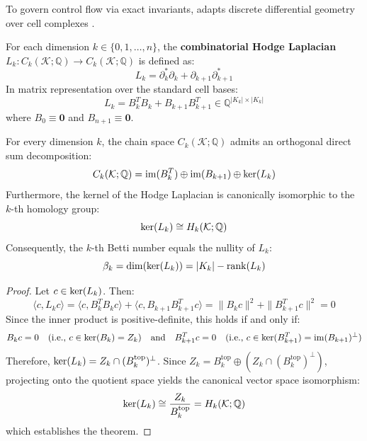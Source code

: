 To govern control flow via exact invariants, \ToposLang{} adapts discrete differential geometry over cell complexes \cite{lim2020hodge}.

\begin{definition}
For each dimension $k \in \{0, 1, \dots, n\}$, the \textbf{combinatorial Hodge Laplacian} $L_k : C_k(\mathcal{K}; \mathbb{Q}) \to C_k(\mathcal{K}; \mathbb{Q})$ is defined as:
\begin{equation}
    L_k = \partial_k^* \partial_k + \partial_{k+1} \partial_{k+1}^*
\end{equation}
In matrix representation over the standard cell bases:
\begin{equation}
    L_k = B_k^T B_k + B_{k+1} B_{k+1}^T \in \mathbb{Q}^{|K_k| \times |K_k|}
\end{equation}
where $B_0 \equiv \mathbf{0}$ and $B_{n+1} \equiv \mathbf{0}$.
\end{definition}

\begin{theorem}
\label{thm:hodge_decomp}
For every dimension $k$, the chain space $C_k(\mathcal{K}; \mathbb{Q})$ admits an orthogonal direct sum decomposition:
\begin{equation}
    C_k(\mathcal{K}; \mathbb{Q}) = \operatorname{im}(B_k^T) \oplus \operatorname{im}(B_{k+1}) \oplus \operatorname{ker}(L_k)
\end{equation}
Furthermore, the kernel of the Hodge Laplacian is canonically isomorphic to the $k$-th homology group:
\begin{equation}
    \operatorname{ker}(L_k) \cong H_k(\mathcal{K}; \mathbb{Q})
\end{equation}
Consequently, the $k$-th Betti number equals the nullity of $L_k$:
\begin{equation}
    \beta_k = \dim(\operatorname{ker}(L_k)) = |K_k| - \operatorname{rank}(L_k)
\end{equation}
\end{theorem}

\begin{proof}
Let $c \in \operatorname{ker}(L_k)$. Then:
\begin{equation}
    \langle c, L_k c \rangle = \langle c, B_k^T B_k c \rangle + \langle c, B_{k+1} B_{k+1}^T c \rangle = \| B_k c \|^2 + \| B_{k+1}^T c \|^2 = 0
\end{equation}
Since the inner product is positive-definite, this holds if and only if:
\begin{equation}
    B_k c = 0 \quad (\text{i.e., } c \in \operatorname{ker}(B_k) = Z_k) \quad \text{and} \quad B_{k+1}^T c = 0 \quad (\text{i.e., } c \in \operatorname{ker}(B_{k+1}^T) = \operatorname{im}(B_{k+1})^\perp)
\end{equation}
Therefore, $\operatorname{ker}(L_k) = Z_k \cap (B_k^{\text{top}})^\perp$. Since $Z_k = B_k^{\text{top}} \oplus (Z_k \cap (B_k^{\text{top}})^\perp)$, projecting onto the quotient space yields the canonical vector space isomorphism:
\begin{equation}
    \operatorname{ker}(L_k) \cong \frac{Z_k}{B_k^{\text{top}}} = H_k(\mathcal{K}; \mathbb{Q})
\end{equation}
which establishes the theorem.
\end{proof}

